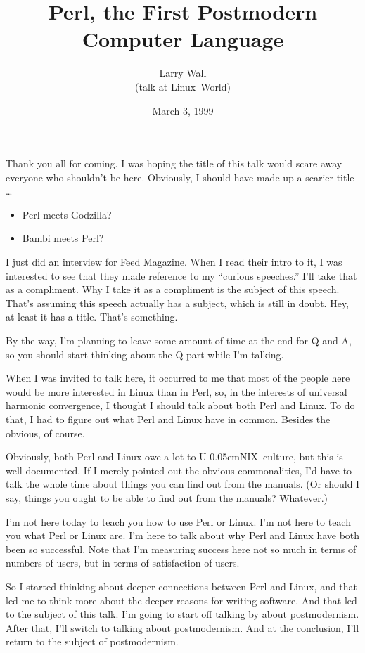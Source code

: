 \documentclass[10pt,letterpaper]{article}
\title{Perl, the First Postmodern Computer Language}
\author{Larry Wall \\ (talk at Linux~World)}
\date{March 3, 1999}
\newcommand{\unix}{{\small U\kern-0.05emNIX\spacefactor1000}}
\begin{document}
\maketitle
\vspace{1in}
\noindent Thank you all for coming. I was hoping the title of this talk would scare
away everyone who shouldn't be here. Obviously, I should have made up a
scarier title \ldots

\begin{itemize}
\item[] Perl meets Godzilla?
\item[] Bambi meets Perl?
\end{itemize}

\noindent I just did an interview for Feed Magazine. When I read their intro to it, I
was interested to see that they made reference to my ``curious speeches.''
I'll take that as a compliment. Why I take it as a compliment is the subject
of this speech. That's assuming this speech actually has a subject, which is
still in doubt. Hey, at least it has a title. That's something.

By the way, I'm planning to leave some amount of time at the end for Q and A,
so you should start thinking about the Q part while I'm talking.

When I was invited to talk here, it occurred to me that most of the people
here would be more interested in Linux than in Perl, so, in the interests of
universal harmonic convergence, I thought I should talk about both Perl and
Linux. To do that, I had to figure out what Perl and Linux have in common.
Besides the obvious, of course.

Obviously, both Perl and Linux owe a lot to \unix\ culture, but this is well
documented. If I merely pointed out the obvious commonalities, I'd have to
talk the whole time about things you can find out from the manuals. (Or
should I say, things you ought to be able to find out from the manuals?
Whatever.)

I'm not here today to teach you how to use Perl or Linux. I'm not here to
teach you what Perl or Linux are.
I'm here to talk about why Perl and Linux have both been so successful. Note
that I'm measuring success here not so much in terms of numbers of users, but
in terms of satisfaction of users.

So I started thinking about deeper connections between Perl and Linux, and
that led me to think more about the deeper reasons for writing software. And
that led to the subject of this talk. I'm going to start off talking by about
postmodernism. After that, I'll switch to talking about postmodernism. And at
the conclusion, I'll return to the subject of postmodernism.
\end{document}
